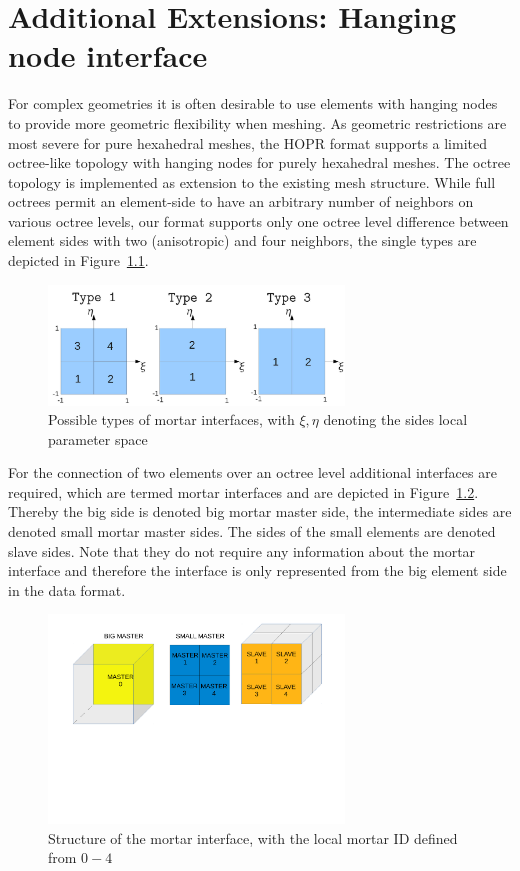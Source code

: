 \documentclass[a4paper,headsepline]{scrreprt}
\begin{document}
\chapter{Additional Extensions: Hanging node interface}

For complex geometries it is often desirable to use elements with hanging nodes to provide more geometric flexibility when meshing. As geometric restrictions are most severe for pure hexahedral meshes, the HOPR format supports a limited octree-like topology with hanging nodes for purely hexahedral meshes. The octree topology is implemented as extension to the existing mesh structure. 
While full octrees permit an element-side to have an arbitrary number of neighbors on various octree levels, our format supports only one octree level difference between element sides with two (anisotropic) and four neighbors, the single types are depicted in Figure~\ref{fig:mortartypes}.

\begin{figure}[h!]
\centering
\includegraphics[width=0.7\textwidth]{pics/Mortar_Types.jpg}
\caption{Possible types of mortar interfaces, with $\xi,\eta$ denoting the sides local parameter space}
\label{fig:mortartypes}
\end{figure}

For the connection of two elements over an octree level additional interfaces are required, which are termed mortar interfaces and are depicted in Figure~\ref{fig:mortarinterface}.
Thereby the big side is denoted big mortar master side, the intermediate sides are denoted small mortar master sides. The sides of the small elements are denoted slave sides. Note that they do not require any information about the mortar interface and therefore the interface is only represented from the big element side in the data format.


\begin{figure}[h!]
\centering
\includegraphics[trim=0 250 50 0,clip,width=0.7\textwidth]{pics/mortar_structure.pdf}
\caption{Structure of the mortar interface, with the local mortar ID defined from $0-4$}
\label{fig:mortarinterface}
\end{figure}
\end{document}
